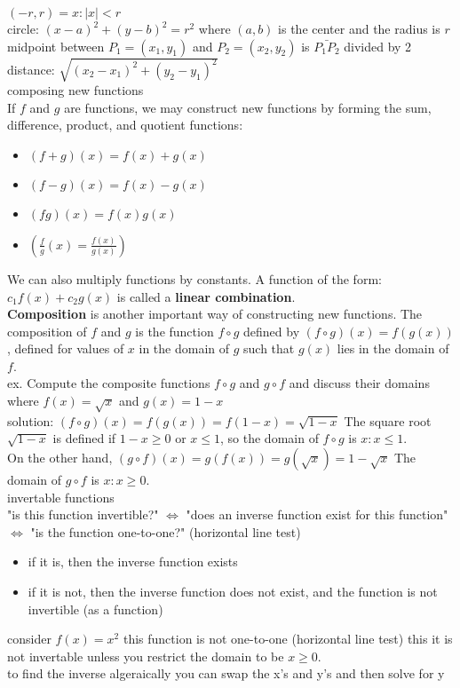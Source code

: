 \documentclass{article}
\begin{document}
$(-r, r) = {x : \lvert x\rvert < r}$\\

circle: $(x-a)^2 + (y-b)^2 = r^2$ where $(a, b)$ is the center and the radius is $r$\\

midpoint between $P_1 = (x_1, y_1)$ and $P_2 = (x_2, y_2)$ is $\bar{P_{1}P_2}$ divided by 2\\

distance: $\sqrt{(x_2 - x_1)^2 + (y_2 - y_1)^2}$\\

composing new functions\\
	If $f$ and $g$ are functions, we may construct new functions by forming the sum, difference, product, and quotient functions:\\
	\begin{itemize}
		\item $(f + g)(x) = f(x) + g(x)$
		\item $(f - g)(x) = f(x) - g(x)$
		\item $(fg)(x) = f(x)g(x)$
		\item $(\frac{f}{g}(x) = \frac{f(x)}{g(x)})$
	\end{itemize}
	We can also multiply functions by constants. A function of the form: $c_1f(x) + c_2g(x)$ is called a \textbf{linear combination}.\\
	\textbf{Composition} is another important way of constructing new functions. The composition of $f$ and $g$ is the function $f \circ g$ defined by $(f \circ g)(x) = f(g(x))$, defined for values of $x$ in the domain of $g$ such that $g(x)$ lies in the domain of $f$.\\
	ex. Compute the composite functions $f \circ g$ and $g \circ f$ and discuss their domains where $f(x) = \sqrt{x}$ and $g(x) = 1 - x$\\
	solution: $(f \circ g)(x) = f(g(x)) = f(1 - x) = \sqrt{1 - x}$ The square root $\sqrt{1 - x}$ is defined if $1 - x \geq 0$ or $x \leq 1$, so the domain of $f \circ g$ is ${x : x \leq 1}$.\\
	On the other hand, $(g \circ f)(x) = g(f(x)) = g(\sqrt{x}) = 1 - \sqrt{x}$ The domain of $g \circ f$ is ${x : x \geq 0}$.\\


invertable functions\\
	"is this function invertible?" $\Leftrightarrow$ "does an inverse function exist for this function" $\Leftrightarrow$ "is the function one-to-one?" (horizontal line test)
	\begin{itemize}
		\item if it is, then the inverse function exists
		\item if it is not, then the inverse function does not exist, and the function is not invertible (as a function)
	\end{itemize}
	consider $f(x) = x^2$ this function is not one-to-one (horizontal line test) this it is not invertable unless you restrict the domain to be $x \geq 0$.\\
	to find the inverse algeraically you can swap the x's and y's and then solve for y\\
\end{document}

